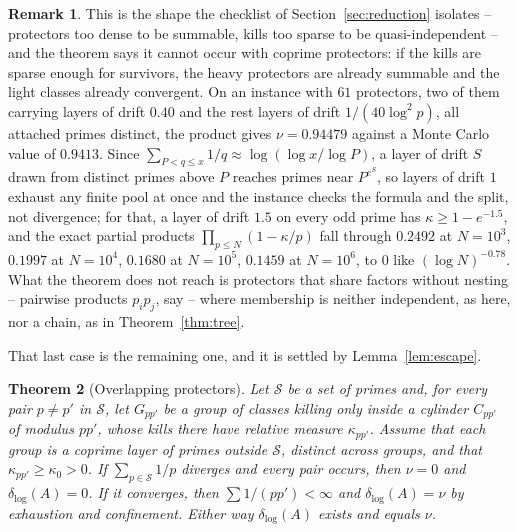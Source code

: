 \documentclass[11pt]{article}
\theoremstyle{plain}
\newtheorem{theorem}{Theorem}[section]
\theoremstyle{definition}
\newtheorem{remark}[theorem]{Remark}
\newcommand{\dlog}{\delta_{\log}}
\begin{document}
\begin{remark}
This is the shape the checklist of Section~\ref{sec:reduction}
isolates -- protectors
too dense to be summable, kills too sparse to be quasi-independent
-- and the theorem says it cannot occur with coprime protectors:
if the kills are sparse enough for survivors, the heavy
protectors are already summable and the light classes already
convergent.  On an instance with $61$ protectors, two of them
carrying layers of drift $0.40$ and the rest layers of drift
$1/(40\log^2p)$, all attached primes distinct, the product gives
$\nu=0.94479$ against a Monte Carlo value of $0.9413$.  Since
$\sum_{P<q\le x}1/q\approx\log(\log x/\log P)$, a layer of drift
$S$ drawn from distinct primes above $P$ reaches primes near
$P^{e^S}$, so layers of drift $1$ exhaust any finite pool at
once and the instance checks the formula and the split, not
divergence; for that, a layer of drift $1.5$ on every odd prime
has $\kappa\ge1-e^{-1.5}$, and the exact partial products
$\prod_{p\le N}(1-\kappa/p)$ fall through $0.2492$ at $N=10^{3}$, $0.1997$ at $N=10^{4}$, $0.1680$ at $N=10^{5}$, $0.1459$ at $N=10^{6}$, to $0$ like
$(\log N)^{-0.78}$.  What the theorem does not reach is
protectors that share factors without nesting -- pairwise
products $p_ip_j$, say -- where membership is neither
independent, as here, nor a chain, as in Theorem~\ref{thm:tree}.
\end{remark}

That last case is the remaining one, and it is settled by
Lemma~\ref{lem:escape}.

\begin{theorem}[Overlapping protectors]\label{thm:overlap}
Let $\mathcal{S}$ be a set of primes and, for every pair
$p\ne p'$ in $\mathcal{S}$, let $G_{pp'}$ be a group of classes
killing only inside a cylinder $C_{pp'}$ of modulus $pp'$, whose
kills there have relative measure $\kappa_{pp'}$.  Assume that
each group is a coprime layer of primes outside $\mathcal{S}$,
distinct across groups, and that $\kappa_{pp'}\ge\kappa_0>0$.
If $\sum_{p\in\mathcal{S}}1/p$ diverges and every pair occurs,
then $\nu=0$ and $\dlog(A)=0$.  If it converges, then
$\sum1/(pp')<\infty$ and $\dlog(A)=\nu$ by exhaustion and
confinement.  Either way $\dlog(A)$ exists and equals $\nu$.
\end{theorem}
\end{document}
